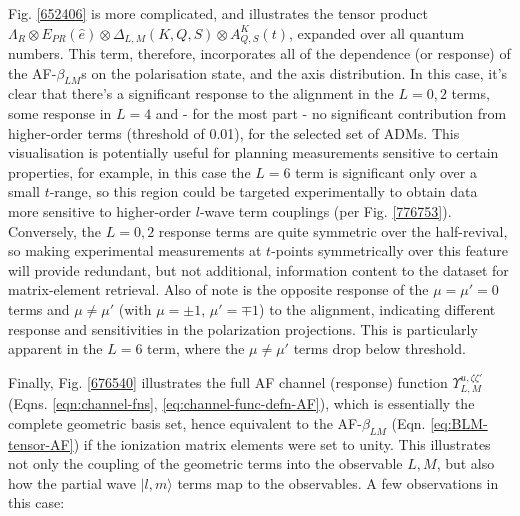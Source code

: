 \documentclass[10pt]{article}
\begin{document}
Fig. \ref{652406} is more complicated, and illustrates the tensor product $\Lambda_{R}\otimes E_{PR}(\hat{e})\otimes \Delta_{L,M}(K,Q,S)\otimes A^{K}_{Q,S}(t)$, expanded over all quantum numbers.
This term, therefore, incorporates all of the dependence (or response) of the AF-$\beta_{LM}$s on the polarisation state, and the axis distribution. In this case, it's clear that there's a significant response to the alignment in the $L=0,2$ terms, some response in $L=4$ and - for the most part - no significant contribution from higher-order terms (threshold of 0.01), for the selected set of ADMs. This visualisation is potentially useful for planning measurements sensitive to certain properties, for example, in this case the $L=6$ term is significant only over a small $t$-range, so this region could be targeted experimentally to obtain data more sensitive to higher-order $l$-wave term couplings (per Fig. \ref{776753}). Conversely, the $L=0,2$ response terms are quite symmetric over the half-revival, so making experimental measurements at $t$-points symmetrically over this feature will provide redundant, but not additional, information content to the dataset for matrix-element retrieval. Also of note is the opposite response of the $\mu=\mu'=0$ terms and $\mu\neq\mu'$ (with $\mu=\pm1$, $\mu'=\mp1$) to the alignment, indicating different response and sensitivities in the polarization projections. This is particularly apparent in the $L=6$ term, where the $\mu\neq\mu'$ terms drop below threshold.

Finally, Fig. \ref{676540} illustrates the full AF channel (response) function $\varUpsilon_{L,M}^{u,\zeta\zeta'}$ (Eqns. \ref{eqn:channel-fns}, \ref{eq:channel-func-defn-AF}), which is essentially the complete geometric basis set,
hence equivalent to the AF-$\beta_{LM}$ (Eqn. \ref{eq:BLM-tensor-AF}) if the ionization matrix elements were set to unity. This illustrates not only the coupling of the geometric terms into the observable $L,M$, but also how the partial wave $|l,m\rangle$ terms map to the observables. %
A few observations in this case:
\end{document}
